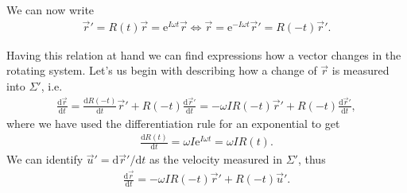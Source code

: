 \documentclass[10pt,a4paper]{article}
\newcommand{\e}{\mathrm{e}}
\renewcommand{\d}{\mathrm{d}}
\begin{document}
%
We can now write
%
\begin{align}
\boxed{\vec{r}' = R(t) \vec{r} =  \e^{I \omega t}  \vec{r} \iff \vec{r} = \e^{-I \omega t}  \vec{r}' =R(-t) \vec{r}'  .}
\end{align}

Having this relation at hand we can find expressions how a vector changes in the rotating system.
%
Let's us begin with describing how a change of $\vec{r}$ is measured into $\Sigma'$, i.e.
%
\begin{align}
\frac{\d \vec{r}}{\d t} = \frac{\d R(-t)}{\d t} \vec{r}' + R(-t) \frac{\d \vec{r}'}{\d t} =   -\omega I  R(-t) \vec{r}' + R(-t) \frac{\d \vec{r}'}{\d t} ,
\end{align}
%
where we have used the differentiation rule for an exponential to get
%
\begin{align}
\frac{\d R(t)}{\d t} = \omega I  \e^{I \omega t} = \omega I R(t).
\end{align}
%
We can identify $\vec{u}' = {\d \vec{r}'}/{\d t}$ as the velocity measured in $\Sigma'$, thus
%
\begin{align}
\frac{\d \vec{r}}{\d t} =  -\omega I R(-t) \vec{r}' + R(-t) \vec{u}'.
\end{align}
\end{document}
